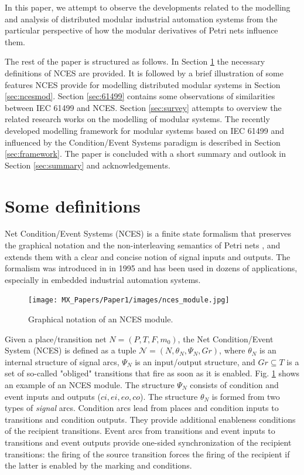 \begin{bibunit}
In this paper, we attempt to observe the developments related to the modelling and analysis of distributed modular industrial automation systems from the particular perspective of how the modular derivatives of Petri nets influence them.

The rest of the paper is structured as follows. In Section \ref{sec:def} the necessary definitions of NCES are provided. It is followed by a brief illustration of some features NCES provide for modelling distributed modular systems in Section \ref{sec:ncesmod}. Section \ref{sec:61499} contains some observations of similarities between IEC 61499 and NCES. Section \ref{sec:survey} attempts to overview the related research works on the modelling of modular systems. The recently developed modelling framework for modular systems based on IEC 61499 and influenced by the Condition/Event Systems paradigm is described in Section \ref{sec:framework}. The paper is concluded with a short summary and outlook in Section \ref{sec:summary} and acknowledgements. 

\section{Some definitions}\label{sec:def}

Net Condition/Event Systems (NCES) is a finite state formalism that preserves the graphical notation and the non-interleaving semantics of Petri nets \cite{Petri62}, and extends them with a clear and concise notion of signal inputs and outputs. The formalism was introduced in \cite{RaHA95} in 1995 and has been used in dozens of applications, especially in embedded industrial automation systems. 

\begin{figure}
    \centering
    \texttt{[image: MX\_Papers/Paper1/images/nces\_module.jpg]}
    \caption{Graphical notation of an NCES module.}
    \label{fig:nces}
\end{figure}

Given a place/transition net $N=(P,T,F,m_0)$, the
Net Condition/Event System (NCES) is defined as a tuple
$\mathcal{N}=(N,\theta_N,\Psi_N, Gr)$, where $\theta_N$ is an internal
structure of signal arcs, $\Psi_N$ is an input/output structure,
and $Gr \subseteq T$ is a set of so-called "obliged" transitions that fire as soon as it is enabled.
Fig. \ref{fig:nces} shows an example of an NCES module. 
The structure $\Psi_N$ consists of
condition and event inputs and outputs ($ci,ei,eo,co$). The
structure $\theta_N$ is formed from two types of {\it signal}
arcs. Condition arcs lead from places and condition inputs to
transitions and condition outputs. They provide additional
enableness conditions of the recipient transitions. Event arcs
from transitions and event inputs to transitions and event
outputs provide one-sided synchronization of the recipient
transitions: the firing of the source transition forces the firing of the recipient if the latter is enabled by the marking and conditions.


\end{bibunit}
